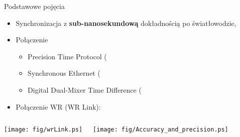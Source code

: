 \documentclass[compress,red]{beamer}
\begin{document}
\begin{frame}{Podstawowe pojęcia}

  \begin{itemize}
    \item Synchronizacja z {\bf sub-nanosekundową} dokładnością po światłowodzie,
    \item Połączenie
	\begin{itemize}
	  \item Precision Time Protocol (\color{blue}{PTP}\color{black}{) - synchronizacja,}
	  \item Synchronous Ethernet (\color{blue}{SyncE}\color{black}{) syntonizacja,}
	  \item Digital Dual-Mixer Time Difference (\color{blue}{DDMTD}\color{black}{) - pomiar fazy,}

	\end{itemize}
    \item Połączenie WR (WR Link):
  \end{itemize}

\begin{columns}[c]

  \begin{center}
  \texttt{[image: fig/wrLink.ps]}
  \end{center}

  \vspace{2cm}


  \begin{center}
  \texttt{[image: fig/Accuracy\_and\_precision.ps]}
  \end{center}

  \vspace{1cm}

\end{columns}


\end{frame}
\end{document}
